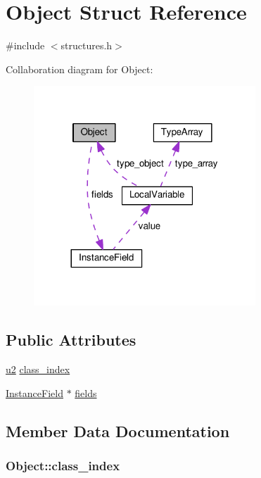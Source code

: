 \hypertarget{structObject}{}\section{Object Struct Reference}
\label{structObject}


{\ttfamily \#include $<$structures.\+h$>$}



Collaboration diagram for Object\+:
\nopagebreak
\begin{figure}[H]
\begin{center}
\leavevmode
\includegraphics[width=236pt]{structObject__coll__graph}
\end{center}
\end{figure}
\subsection*{Public Attributes}
\begin{DoxyCompactItemize}
\item 
\hyperlink{structures_8h_a55ef8d87fd202b8417704c089899c5b9}{u2} \hyperlink{structObject_a01bbcbf2d8f45a2ee870d1957940a6d7}{class\+\_\+index}
\item 
\hyperlink{structInstanceField}{Instance\+Field} $\ast$ \hyperlink{structObject_a80adc59e34cc54216d8e7a6c9a4e9264}{fields}
\end{DoxyCompactItemize}


\subsection{Member Data Documentation}
\subsubsection[{\texorpdfstring{class\+\_\+index}{class_index}}]{ Object\+::class\+\_\+index}\hypertarget{structObject_a01bbcbf2d8f45a2ee870d1957940a6d7}{}\label{structObject_a01bbcbf2d8f45a2ee870d1957940a6d7}
